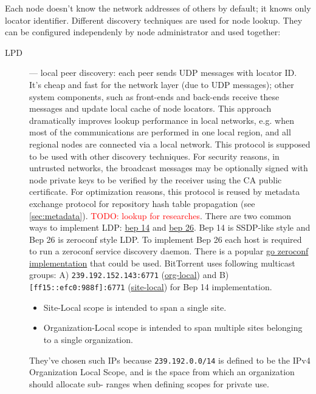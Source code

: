 \documentclass[acmlarge, screen, nonacm, 11pt]{acmart}
\newcommand{\code}[1]{\texttt{#1}}
\newcommand{\todo}[1]{\textcolor{red}{TODO: #1}}
\begin{document}
Each node doesn't know the network addresses of others by default;
it knows only locator identifier.
Different discovery techniques are used for node lookup.
They can be configured independenly by node
administrator and used together:

\begin{description}
  \item[LPD] --- local peer discovery: each peer sends UDP messages with locator ID.
    It's cheap and fast for the network layer (due to UDP messages); other system components,
    such as front-ends and back-ends receive these messages and update local cache of node locators.
    This approach dramatically improves lookup performance in local networks, e.g. when most of the communications
    are performed in one local region, and all regional nodes are connected via a local network.
    This protocol is supposed to be used with other discovery techniques.
    For security reasons, in untrusted networks, the broadcast messages may be optionally signed with
    node private keys to be verified by the receiver using the CA public certificate.
    For optimization reasons, this protocol is reused by metadata exchange protocol for
    repository hash table propagation (see \ref{sec:metadata}). \todo{lookup for researches}.
    There are two common ways to implement LDP: \href{http://bittorrent.org/beps/bep_0014.html}{bep 14} and \href{http://bittorrent.org/beps/bep_0026.html}{bep 26}.
    Bep 14 is SSDP-like style and Bep 26 is zeroconf style LDP. To implement Bep 26 each host is required to run a zeroconf service discovery daemon.
    There is a popular \href{https://github.com/grandcat/zeroconf}{go zeroconf implementation} that could be used.
    BitTorrent uses following multicast groups: A) \code{239.192.152.143:6771} (\href{https://tools.ietf.org/html/rfc2365#section-6.2}{org-local}) and B) \code{[ff15::efc0:988f]:6771} (\href{https://tools.ietf.org/html/rfc4291#section-2.5.7}{site-local}) for Bep 14 implementation.
    \begin{itemize}
      \item Site-Local scope is intended to span a single site.
      \item Organization-Local scope is intended to span multiple sites
      belonging to a single organization.
    \end{itemize}
    They've chosen such IPs because \code{239.192.0.0/14} is defined to be the IPv4 Organization Local Scope,
    and is the space from which an organization should allocate sub-
    ranges when defining scopes for private use.

\end{description}
\end{document}
